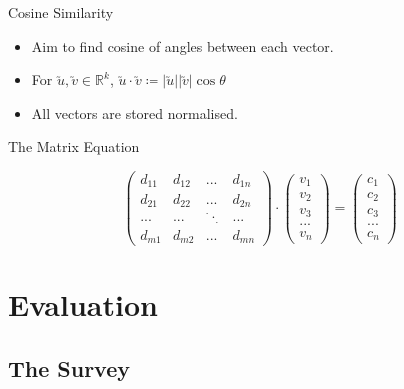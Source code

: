 \documentclass{beamer}
\begin{document}
\begin{frame}{Cosine Similarity}
    \begin{itemize}
        \item Aim to find cosine of angles between each vector.
        \item For $\utilde{u}, \utilde{v}\in \mathbb{R} ^{k}$, 
        $\utilde{u} \cdot \utilde{v} \coloneqq \vert \utilde{u} \vert \vert \utilde{v} \vert \cos{\theta}$
        \item All vectors are stored normalised.
    \end{itemize}

    \begin{block}{The Matrix Equation}
        
    \begin{equation}
        \begin{pmatrix}
            d_{11} & d_{12} & ... & d_{1n}\\
            d_{21} & d_{22} & ... & d_{2n}\\
            ...    & ...    & ^{\cdot}\cdot _{\cdot} & ...   \\
            d_{m1} & d_{m2} & ... & d_{mn}
        \end{pmatrix}
        \cdot
        \begin{pmatrix}
            v_1 \\ v_2 \\ v_3 \\ ... \\ v_n
        \end{pmatrix}
        =
        \begin{pmatrix}
            c_1 \\ c_2 \\ c_3 \\ ... \\ c_n
        \end{pmatrix}
    \end{equation}
\end{block}

\end{frame}

\section{Evaluation} 

\subsection{The Survey}
\end{document}
